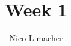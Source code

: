 \documentclass{article}
\begin{document}
	
	\title{Week 1}
	\author{Nico Limacher}
	
\maketitle

\section{}
\end{document}
